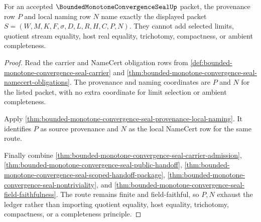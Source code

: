 \begin{theorem}
\label{thm:bounded-monotone-convergence-seal-ledger-exhaustion}
For an accepted $\BoundedMonotoneConvergenceSealUp$ packet, the provenance row $P$ and local naming row $N$ name exactly the displayed packet $S=(W,M,K,F,\sigma,D,L,R,H,C,P,N)$. They cannot add selected limits, quotient stream equality, host real equality, trichotomy, compactness, or ambient completeness.
\end{theorem}
\begin{proof}
Read the carrier and NameCert obligation rows from \autoref{def:bounded-monotone-convergence-seal-carrier} and \autoref{thm:bounded-monotone-convergence-seal-namecert-obligations}. The provenance and naming coordinates are $P$ and $N$ for the listed packet, with no extra coordinate for limit selection or ambient completeness.

Apply \autoref{thm:bounded-monotone-convergence-seal-provenance-local-naming}. It identifies $P$ as source provenance and $N$ as the local NameCert row for the same route.

Finally combine \autoref{thm:bounded-monotone-convergence-seal-carrier-admission}, \autoref{thm:bounded-monotone-convergence-seal-public-handoff}, \autoref{thm:bounded-monotone-convergence-seal-scoped-handoff-package}, \autoref{thm:bounded-monotone-convergence-seal-nontriviality}, and \autoref{thm:bounded-monotone-convergence-seal-field-faithfulness}. The route remains finite and field-faithful, so $P,N$ exhaust the ledger rather than importing quotient equality, host equality, trichotomy, compactness, or a completeness principle.
\end{proof}

